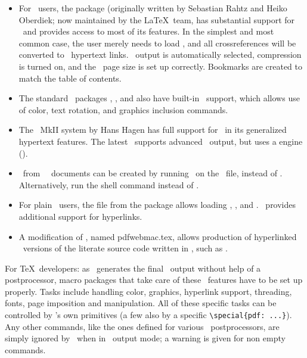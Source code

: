 \documentclass{pdftexmanual}
\begin{document}
\begin{itemize}
\item  For \LATEX\ users, the  package (originally
       written by Sebastian Rahtz and Heiko Oberdiek; now maintained by
       the \LaTeX\ team, has substantial support for \PDFTEX\ and
       provides access to most of its features. In the simplest and most
       common case, the user merely needs to load , and
       all cross\hyph references will be converted to \PDF\ hypertext
       links. \PDF\ output is automatically selected, compression is
       turned on, and the \PDF\ page size is set up correctly. Bookmarks
       are created to match the table of contents.

\item  The standard \LATEX\ packages , , and
        also have built-in \PDFTEX\ support, which allows
       use of color, text rotation, and graphics inclusion commands.

\item  The \CONTEXT\ MkII system by Hans Hagen has full support
       for \PDFTEX\ in its generalized hypertext features.
       The latest \CONTEXT\ supports advanced \PDF\ output, but
       uses a engine (\LMTX).

\item  \PDF\ from \GNU\ \TEXINFO\ documents can be created by running
       \PDFTEX\ on the \TEXINFO\ file, instead of \TEX. Alternatively,
       run the shell command  instead of .

\item  For plain \TEX\ users, the  file from the
        package allows loading ,
       , and . \EPLAIN\ provides additional
       support for hyperlinks.

\item  A modification of , named \filename
       {pdfwebmac.tex}, allows production of hyperlinked \PDF\ versions
       of the literate source code written in \WEB, such as \PDFTEX.

\end{itemize}

For \TeX\ developers: as \PDFTEX\ generates the final \PDF\ output
without help of a postprocessor, macro packages that take care of these
\PDF\ features have to be set up properly. Tasks include handling color,
graphics, hyperlink support, threading, fonts, page imposition and
manipulation. All of these \PDF\hyph specific tasks can be controlled by
\PDFTEX's own primitives (a few also by a \PDFTEX\hyph specific
\verb|\special{pdf: ...}|). Any other  commands, like the
ones defined for various \DVI\ postprocessors, are simply ignored by
\PDFTEX\ when in \PDF\ output mode; a warning is given for non\hyph
empty  commands.
\end{document}

